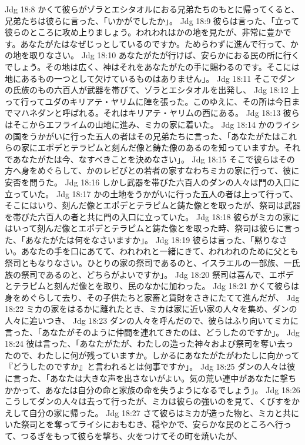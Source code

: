Jdg 18:8  かくて彼らがゾラとエシタオルにおる兄弟たちのもとに帰ってくると、兄弟たちは彼らに言った、「いかがでしたか」。
Jdg 18:9  彼らは言った、「立って彼らのところに攻め上りましょう。われわれはかの地を見たが、非常に豊かです。あなたがたはなぜじっとしているのですか。ためらわずに進んで行って、かの地を取りなさい。
Jdg 18:10  あなたがたが行けば、安らかにおる民の所に行くでしょう。その地は広く、神はそれをあなたがたの手に賜わるのです。そこには地にあるもの一つとして欠けているものはありません」。
Jdg 18:11  そこでダンの氏族のもの六百人が武器を帯びて、ゾラとエシタオルを出発し、
Jdg 18:12  上って行ってユダのキリアテ・ヤリムに陣を張った。このゆえに、その所は今日までマハネダンと呼ばれる。それはキリアテ・ヤリムの西にある。
Jdg 18:13  彼らはそこからエフライムの山地に進み、ミカの家に着いた。
Jdg 18:14  かのライシの国をうかがいに行った五人の者はその兄弟たちに言った、「あなたがたはこれらの家にエポデとテラピムと刻んだ像と鋳た像のあるのを知っていますか。それであなたがたは今、なすべきことを決めなさい」。
Jdg 18:15  そこで彼らはその方へ身をめぐらして、かのレビびとの若者の家すなわちミカの家に行って、彼に安否を問うた。
Jdg 18:16  しかし武器を帯びた六百人のダンの人々は門の入口に立っていた。
Jdg 18:17  かの土地をうかがいに行った五人の者は上って行って、そこにはいり、刻んだ像とエポデとテラピムと鋳た像とを取ったが、祭司は武器を帯びた六百人の者と共に門の入口に立っていた。
Jdg 18:18  彼らがミカの家にはいって刻んだ像とエポデとテラピムと鋳た像とを取った時、祭司は彼らに言った、「あなたがたは何をなさいますか」。
Jdg 18:19  彼らは言った、「黙りなさい。あなたの手を口にあてて、われわれと一緒にきて、われわれのために父とも祭司ともなりなさい。ひとりの家の祭司であるのと、イスラエルの一部族、一氏族の祭司であるのと、どちらがよいですか」。
Jdg 18:20  祭司は喜んで、エポデとテラピムと刻んだ像とを取り、民のなかに加わった。
Jdg 18:21  かくて彼らは身をめぐらして去り、その子供たちと家畜と貨財をさきにたてて進んだが、
Jdg 18:22  ミカの家をはるかに離れたとき、ミカは家に近い家の人々を集め、ダンの人々に追いつき、
Jdg 18:23  ダンの人々を呼んだので、彼らはふり向いてミカに言った、「あなたがそのように仲間を連れてきたのは、どうしたのですか」。
Jdg 18:24  彼は言った、「あなたがたが、わたしの造った神々および祭司を奪い去ったので、わたしに何が残っていますか。しかるにあなたがたがわたしに向かって『どうしたのですか』と言われるとは何事ですか」。
Jdg 18:25  ダンの人々は彼に言った、「あなたは大きな声を出さないがよい。気の荒い連中があなたに撃ちかかって、あなたは自分の命と家族の命を失うようになるでしょう」。
Jdg 18:26  こうしてダンの人々は去って行ったが、ミカは彼らの強いのを見て、くびすをかえして自分の家に帰った。
Jdg 18:27  さて彼らはミカが造った物と、ミカと共にいた祭司とを奪ってライシにおもむき、穏やかで、安らかな民のところへ行って、つるぎをもって彼らを撃ち、火をつけてその町を焼いたが、
